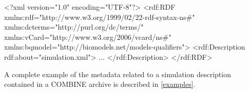 \begin{example}
<?xml version="1.0" encoding="UTF-8"?>
<rdf:RDF xmlns:rdf="http://www.w3.org/1999/02/22-rdf-syntax-ns#" 
         xmlns:dcterms="http://purl.org/dc/terms/" 
	 xmlns:vCard="http://www.w3.org/2006/vcard/ns#"
	 xmlns:bqmodel="http://biomodels.net/models-qualifiers">
   <rdf:Description rdf:about="simulation.xml">
   ...
	 </rdf:Description>
</rdf:RDF>
\end{example}

A complete example of the metadata related to a simulation description contained in a COMBINE archive is described in \ref{examples}. 


